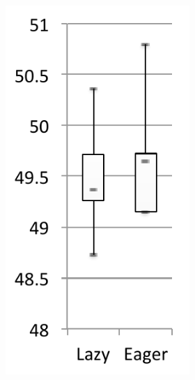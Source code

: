 \documentclass[sigplan,10pt,review,anonymous]{acmart}\settopmatter{printfolios=true,printccs=false,printacmref=false}
\begin{document}
\begin{figure}[bth]
	\centering
	\begin{subfigure}[b]{.48\textwidth}
    	\hspace{.03\textwidth}\begin{subfigure}[b]{.28\textwidth}
		\includegraphics[width=\linewidth]{figures/netBeansLoadExecTime} 

\end{subfigure}
\end{subfigure}
\end{figure}
\end{document}
